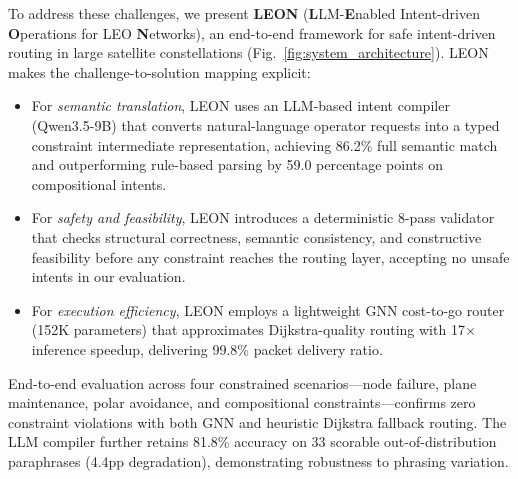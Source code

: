 \documentclass[10pt, conference, letterpaper]{IEEEtran}
\begin{document}
To address these challenges, we present \textbf{LEON}
(\textbf{L}LM-\textbf{E}nabled Intent-driven \textbf{O}perations
for LEO \textbf{N}etworks), an end-to-end framework for safe
intent-driven routing in large satellite constellations
(Fig.~\ref{fig:system_architecture}). LEON makes
the challenge-to-solution mapping explicit:
\begin{itemize}[leftmargin=*]
\item For \emph{semantic translation}, LEON uses an LLM-based intent
compiler (Qwen3.5-9B) that converts natural-language operator
requests into a typed constraint intermediate representation,
achieving 86.2\% full semantic match and outperforming rule-based
parsing by 59.0 percentage points on compositional intents.
\item For \emph{safety and feasibility}, LEON introduces a
deterministic 8-pass validator that checks structural correctness,
semantic consistency, and constructive feasibility before any
constraint reaches the routing layer, accepting no unsafe intents
in our evaluation.
\item For \emph{execution efficiency}, LEON employs a lightweight
GNN cost-to-go router (152K parameters) that approximates
Dijkstra-quality routing with 17$\times$ inference speedup,
delivering 99.8\% packet delivery ratio.
\end{itemize}

\noindent End-to-end evaluation across four constrained
scenarios---node failure, plane maintenance, polar avoidance, and
compositional constraints---confirms zero constraint violations with
both GNN and heuristic Dijkstra fallback routing. The LLM
compiler further retains 81.8\% accuracy on 33 scorable
out-of-distribution paraphrases (4.4pp degradation), demonstrating
robustness to phrasing variation.
\end{document}
